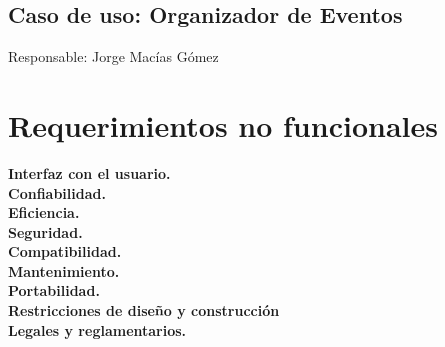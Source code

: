 \documentclass{article}
\newcommand{\newsubsection}[1]{
  \indent \textbf{#1}\\
}
\begin{document}
\subsection{Caso de uso: Organizador de Eventos}
Responsable: Jorge Macías Gómez


\section{Requerimientos no funcionales}
\newsubsection{Interfaz con el usuario.}
\newsubsection{Confiabilidad.}
\newsubsection{Eficiencia.}
\newsubsection{Seguridad.}
\newsubsection{Compatibilidad.}
\newsubsection{Mantenimiento.}
\newsubsection{Portabilidad.}
\newsubsection{Restricciones de diseño y construcción}
\newsubsection{Legales y reglamentarios.}
\end{document}

